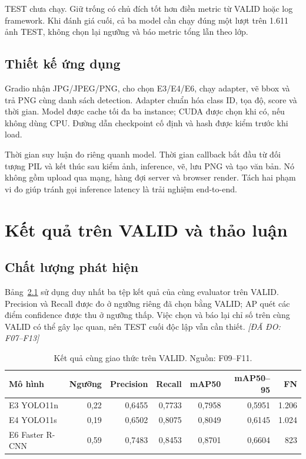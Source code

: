 \documentclass[12pt,a4paper,oneside]{report}
\newcommand{\measured}[1]{\textit{[ĐÃ ĐO: #1]}}
\begin{document}
TEST chưa chạy. Giữ trống có chủ đích tốt hơn điền metric từ VALID hoặc log framework. Khi đánh giá cuối, cả ba model cần chạy đúng một lượt trên 1.611 ảnh TEST, không chọn lại ngưỡng và báo metric tổng lẫn theo lớp.

\section{Thiết kế ứng dụng}
Gradio nhận JPG/JPEG/PNG, cho chọn E3/E4/E6, chạy adapter, vẽ bbox và trả PNG cùng danh sách detection. Adapter chuẩn hóa class ID, tọa độ, score và thời gian. Model được cache tối đa ba instance; CUDA được chọn khi có, nếu không dùng CPU. Đường dẫn checkpoint cố định và hash được kiểm trước khi load.

Thời gian suy luận đo riêng quanh model. Thời gian callback bắt đầu từ đối tượng PIL và kết thúc sau kiểm ảnh, inference, vẽ, lưu PNG và tạo văn bản. Nó không gồm upload qua mạng, hàng đợi server và browser render. Tách hai phạm vi đo giúp tránh gọi inference latency là trải nghiệm end-to-end.



\chapter{Kết quả trên VALID và thảo luận}\label{chap:results}
\section{Chất lượng phát hiện}
Bảng~\ref{tab:valid} sử dụng duy nhất ba tệp kết quả của cùng evaluator trên VALID. Precision và Recall được đo ở ngưỡng riêng đã chọn bằng VALID; AP quét các điểm confidence được thu ở ngưỡng thấp. Việc chọn và báo lại chỉ số trên cùng VALID có thể gây lạc quan, nên TEST cuối độc lập vẫn cần thiết. \measured{F07--F13}

\begin{table}[htbp]\centering\small
\caption{Kết quả cùng giao thức trên VALID. Nguồn: F09--F11.}\label{tab:valid}
\begin{tabular}{lrrrrrr}\toprule
Mô hình & Ngưỡng & Precision & Recall & mAP50 & mAP50--95 & FN\\\midrule
E3 YOLO11n & 0,22 & 0,6455 & 0,7733 & 0,7958 & 0,5951 & 1.206\\
E4 YOLO11s & 0,19 & 0,6502 & 0,8075 & 0,8049 & 0,6145 & 1.024\\
E6 Faster R-CNN & 0,59 & 0,7483 & 0,8453 & 0,8701 & 0,6604 & 823\\\bottomrule
\end{tabular}
\end{table}
\end{document}
